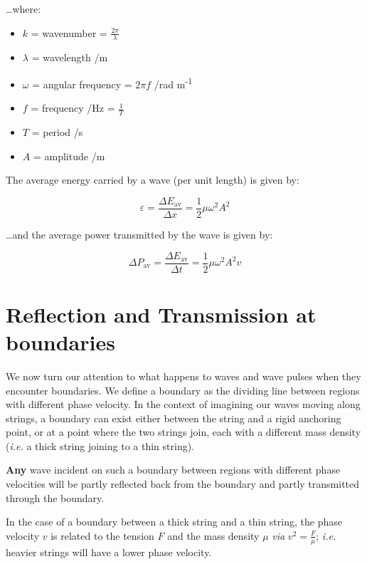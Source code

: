 \documentclass[
]{book}
\providecommand{\tightlist}{%
  \setlength{\itemsep}{0pt}\setlength{\parskip}{0pt}}
\begin{document}
\ldots where:

\begin{itemize}
\tightlist
\item
  \(k\) = wavenumber = \(\frac{2\pi}{\lambda}\)
\item
  \(\lambda\) = wavelength /m
\item
  \(\omega\) = angular frequency = \(2\pi f\) /rad m\textsuperscript{-1}
\item
  \(f\) = frequency /Hz = \(\frac{1}{T}\)
\item
  \(T\) = period /s
\item
  \(A\) = amplitude /m
\end{itemize}

The average energy carried by a wave (per unit length) is given by:

\begin{equation}
\varepsilon = \frac{\Delta E_{\mathrm{av}}}{\Delta x} = \frac{1}{2} \mu \omega^2 A^2
\end{equation}

\ldots and the average power transmitted by the wave is given by:

\begin{equation}
\Delta P_{\mathrm{av}} = \frac{\Delta E_{\mathrm{av}}}{\Delta t} = \frac{1}{2}\mu \omega^2 A^2 v
\end{equation}

\hypertarget{sec:ch8-reflectiontrans}{%
\chapter{Reflection and Transmission at boundaries}\label{sec:ch8-reflectiontrans}}

We now turn our attention to what happens to waves and wave pulses when they encounter boundaries. We define a boundary as the dividing line between regions with different phase velocity. In the context of imagining our waves moving along strings, a boundary can exist either between the string and a rigid anchoring point, or at a point where the two strings join, each with a different mass density (\emph{i.e.} a thick string joining to a thin string).

\textbf{Any} wave incident on such a boundary between regions with different phase velocities will be partly reflected back from the boundary and partly transmitted through the boundary.

In the case of a boundary between a thick string and a thin string, the phase velocity \(v\) is related to the tension \(F\) and the mass density \(\mu\) \emph{via} \(v^2 = \frac{F}{\mu}\); \emph{i.e.} heavier strings will have a lower phase velocity.
\end{document}
